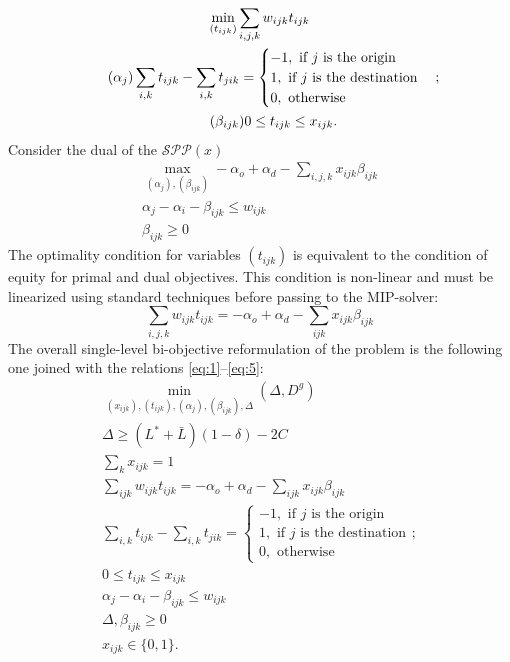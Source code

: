 \documentclass{article}
\begin{document}
\begin{gather*}
	\min_{(t_{ijk})} \sum_{i, j, k} w_{ijk} t_{ijk}\\
	\tag{$\alpha_j$}
	\sum_{i, k} t_{ijk} - \sum_{i, k} t_{jik} = \begin{cases}
		-1, \mbox{ if $j$ is the origin}\\
		1, \mbox{ if $j$ is the destination}\\
		0, \mbox{ otherwise}
	\end{cases};\\
    \tag{$\beta_{ijk}$}
    0 \leq t_{ijk} \leq x_{ijk}.
\end{gather*}
Consider the dual of the $\mathcal{SPP}(x)$
\begin{gather}
    \max_{(\alpha_j), (\beta_{ijk})} -\alpha_o + \alpha_d - \sum_{i, j, k} x_{ijk}\beta_{ijk}\\
    \alpha_j - \alpha_i - \beta_{ijk}\leq w_{ijk}\\
    \beta_{ijk} \geq 0
\end{gather}
The optimality condition for variables $(t_{ijk})$ is equivalent to the condition of equity for primal and dual objectives.
This condition is non-linear and must be linearized using standard techniques before passing to the MIP-solver:
\begin{equation*}
    \sum_{i,j,k} w_{ijk}t_{ijk} = - \alpha_o + \alpha_d - \sum_{ijk}x_{ijk}\beta_{ijk}
\end{equation*}
The overall single-level bi-objective reformulation of the problem is the following one joined with the relations \eqref{eq:1}--\eqref{eq:5}:
\begin{gather}
    \label{mip:objective} \min_{(x_{ijk}), (t_{ijk}), (\alpha_j), (\beta_{ijk}), \Delta} (\Delta, D^g)\\
    \Delta \geq (L^* + \bar{L})(1 - \delta) - 2C\\
    \sum_k x_{ijk} = 1\\
    \sum_{ijk}w_{ijk}t_{ijk} = - \alpha_o + \alpha_d - \sum_{ijk}x_{ijk}\beta_{ijk}\\
    \sum_{i, k} t_{ijk} - \sum_{i, k} t_{jik} = \begin{cases}
		-1, \mbox{ if $j$ is the origin}\\
		1, \mbox{ if $j$ is the destination}\\
		0, \mbox{ otherwise}
	\end{cases};\\
    0 \leq t_{ijk} \leq x_{ijk}\\
    \alpha_j - \alpha_i - \beta_{ijk} \leq w_{ijk}\\
    \Delta, \beta_{ijk} \geq 0\\
    x_{ijk}\in \{0, 1\}.
\end{gather}
\end{document}
